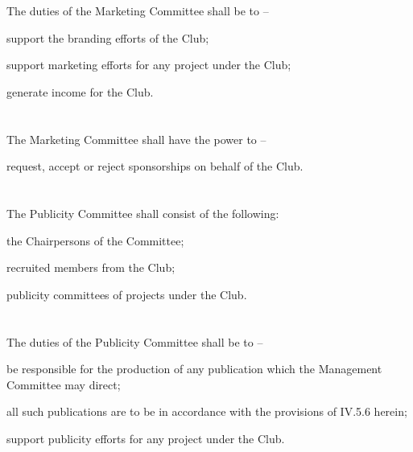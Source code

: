 \section{}
The duties of the Marketing Committee shall be to –
	\begin{legal}
	\item support the branding efforts of the Club;
	\item support marketing efforts for any project under the Club;
	\item generate income for the Club.
	\end{legal}

\section{}
The Marketing Committee shall have the power to –
	\begin{legal}
	\item request, accept or reject sponsorships on behalf of the Club.
	\end{legal}

\section{}
The Publicity Committee shall consist of the following:
	\begin{legal}
	\item the Chairpersons of the Committee;
	\item recruited members from the Club;
	\item publicity committees of projects under the Club.
	\end{legal}

\section{}
The duties of the Publicity Committee shall be to –
\begin{legal}
	\item be responsible for the production of any publication which the Management Committee may direct;
		\begin{legal}
		\item all such publications are to be in accordance with the provisions of IV.5.6 herein;
		\end{legal}
	\item support publicity efforts for any project under the Club.
	\end{legal}

